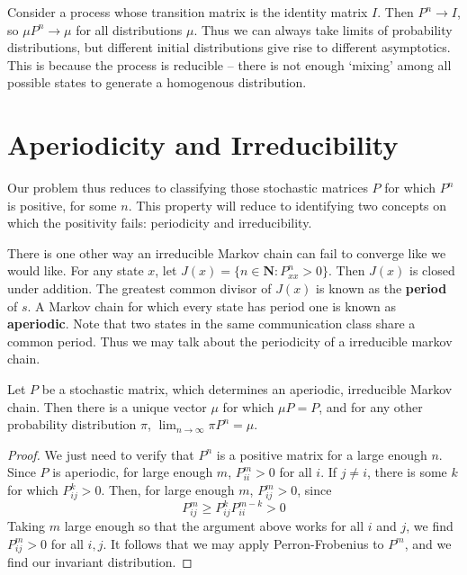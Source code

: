 \begin{example}
    Consider a process whose transition matrix is the identity matrix $I$. Then $P^n \to I$, so $\mu P^n \to \mu$ for all distributions $\mu$. Thus we can always take limits of probability distributions, but different initial distributions give rise to different asymptotics. This is because the process is reducible -- there is not enough `mixing' among all possible states to generate a homogenous distribution.
\end{example}

\section{Aperiodicity and Irreducibility}

Our problem thus reduces to classifying those stochastic matrices $P$ for which $P^n$ is positive, for some $n$. This property will reduce to identifying two concepts on which the positivity fails: periodicity and irreducibility.

There is one other way an irreducible Markov chain can fail to converge like we would like. For any state $x$, let $J(x) = \{ n \in \mathbf{N}: P^n_{xx} > 0 \}$. Then $J(x)$ is closed under addition. The greatest common divisor of $J(x)$ is known as the {\bf period} of $s$. A Markov chain for which every state has period one is known as {\bf aperiodic}. Note that two states in the same communication class share a common period. Thus we may talk about the periodicity of a irreducible markov chain.

\begin{theorem}
    Let $P$ be a stochastic matrix, which determines an aperiodic, irreducible Markov chain. Then there is a unique vector $\mu$ for which $\mu P = P$, and for any other probability distribution $\pi$, $\lim_{n \to \infty} \pi P^n = \mu$.
\end{theorem}
\begin{proof}
    We just need to verify that $P^n$ is a positive matrix for a large enough $n$. Since $P$ is aperiodic, for large enough $m$, $P^m_{ii} > 0$ for all $i$. If $j \neq i$, there is some $k$ for which $P^k_{ij} > 0$. Then, for large enough $m$, $P^m_{ij} > 0$, since
    \[ P^m_{ij} \geq P^{k}_{ij} P^{m-k}_{ii} > 0 \]
    Taking $m$ large enough so that the argument above works for all $i$ and $j$, we find $P^m_{ij} > 0$ for all $i,j$. It follows that we may apply Perron-Frobenius to $P^m$, and we find our invariant distribution.
\end{proof}

